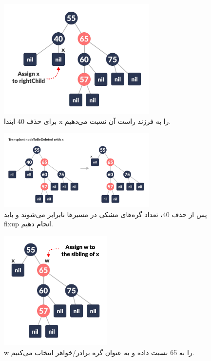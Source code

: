 \documentclass[a4paper,12pt]{article}
\begin{document}
	\begin{figure}[H]
		\centering
		\includegraphics[width=0.7\textwidth]{img/advancedDelFix/delete-2-red-black.png} %
		\caption{برای حذف 40 ابتدا x را به فرزند راست آن نسبت می‌دهیم.}
	\end{figure}
	
	\begin{figure}[H]
		\centering
		\includegraphics[width=0.7\textwidth]{img/advancedDelFix/delete-3-red-black.png} %
		\caption{پس از حذف 40، تعداد گره‌های مشکی در مسیرها نابرابر می‌شوند و باید fixup انجام دهیم.}
	\end{figure}
	
	\begin{figure}[H]
		\centering
		\includegraphics[width=0.5\textwidth]{img/advancedDelFix/delete-4-red-black.png} %
		\caption{w را به 65 نسبت داده و به عنوان گره برادر/خواهر انتخاب می‌کنیم.}
	\end{figure}
	
\end{document}
